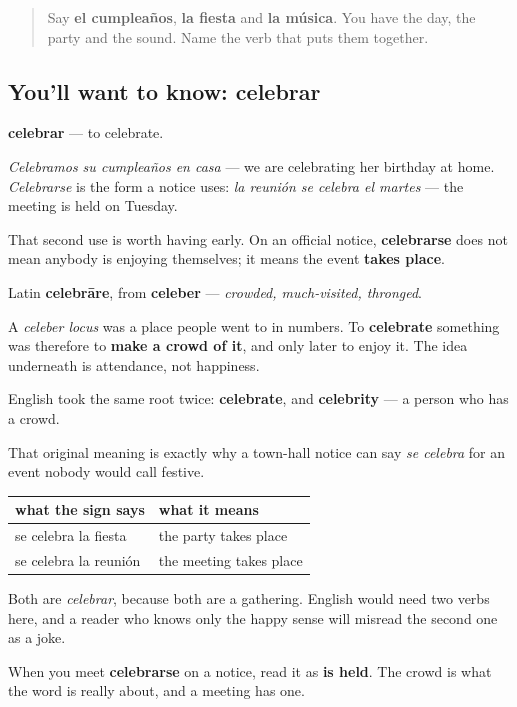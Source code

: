 \label{lesson:ES-C440-celebrar}



\begin{quote}
Say \textbf{el cumpleaños}, \textbf{la fiesta} and \textbf{la música}. You have the day, the party and the sound. Name the verb that puts them together.
\end{quote}

\subsection*{You'll want to know: celebrar}
\textbf{celebrar} — to celebrate.

\emph{Celebramos su cumpleaños en casa} — we are celebrating her birthday at home. \emph{Celebrarse} is the form a notice uses: \emph{la reunión se celebra el martes} — the meeting is held on Tuesday.

That second use is worth having early. On an official notice, \textbf{celebrarse} does not mean anybody is enjoying themselves; it means the event \textbf{takes place}.

\begin{cousinweb}
Latin \textbf{celebrāre}, from \textbf{celeber} — \emph{crowded, much-visited, thronged}.

A \emph{celeber locus} was a place people went to in numbers. To \textbf{celebrate} something was therefore to \textbf{make a crowd of it}, and only later to enjoy it. The idea underneath is attendance, not happiness.

English took the same root twice: \textbf{celebrate}, and \textbf{celebrity} — a person who has a crowd.
\end{cousinweb}

\begin{culture}
That original meaning is exactly why a town-hall notice can say \emph{se celebra} for an event nobody would call festive.

\noindent
\begin{tabularx}{\linewidth}{@{}>{\raggedright\arraybackslash}X>{\raggedright\arraybackslash}X@{}}
\toprule
\textbf{what the sign says} & \textbf{what it means} \\
\midrule
se celebra la fiesta & the party takes place \\
se celebra la reunión & the meeting takes place \\
\bottomrule
\end{tabularx}

Both are \emph{celebrar}, because both are a gathering. English would need two verbs here, and a reader who knows only the happy sense will misread the second one as a joke.

When you meet \textbf{celebrarse} on a notice, read it as \textbf{is held}. The crowd is what the word is really about, and a meeting has one.
\end{culture}

